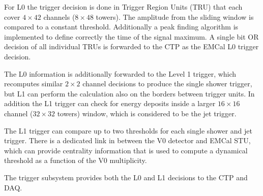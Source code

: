 For L0 the trigger decision is done in Trigger Region Units (TRU) that each cover $4\times42$ channels ($8\times48$ towers). The amplitude from the sliding window is compared to a constant threshold. Additionally a peak finding algorithm is implemented to define correctly the time of the signal maximum. A single bit OR decision of all individual TRUs is forwarded to the CTP as the EMCal L0 trigger decision.

The L0 information is additionally forwarded to the Level 1 trigger, which recomputes similar $2\times2$ channel decisions to produce the single shower trigger, but L1 can perform the calculation also on the borders between trigger units. In addition the L1 trigger can  check for energy deposits inside a larger $16\times16$ channel ($32\times32$ towers) window, which is considered to be the jet trigger.

The L1 trigger can compare up to two thresholds for each single shower and jet trigger. There is a dedicated link in between the V0 detector and EMCal STU, which can provide centrality information that is used to compute a dynamical threshold as a function of the V0 multiplicity.

The trigger subsystem provides both the L0 and L1 decisions to the CTP and DAQ. 
%
